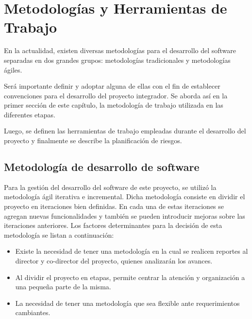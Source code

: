 
\chapter{Metodologías y Herramientas de Trabajo} %

\label{Chapter5} %
En la actualidad, existen diversas metodologías para el desarrollo del software separadas en dos grandes grupos: metodologías tradicionales y metodologías ágiles. 

Será importante definir y adoptar alguna de ellas con el fin de establecer convenciones para el desarrollo del proyecto integrador. Se aborda así en la primer sección de este capítulo, la metodología de trabajo utilizada en las diferentes etapas.

Luego, se definen las herramientas de trabajo empleadas durante el desarrollo del proyecto y finalmente se describe la planificación de riesgos.


\section{Metodología de desarrollo de software}
Para la gestión del desarrollo del software de este proyecto, se utilizó la metodología ágil iterativa e incremental. Dicha metodología consiste en dividir el proyecto en iteraciones bien definidas. En cada una de estas iteraciones se agregan nuevas funcionalidades y también se pueden introducir mejoras sobre las iteraciones anteriores. Los factores determinantes para la decisión de esta metodología se listan a continuación:

\begin{itemize}
	\item Existe la necesidad de tener una metodología en la cual se realicen reportes al director y co-director del proyecto, quienes analizarán los avances.
	\item Al dividir el proyecto en etapas, permite centrar la atención y organización a una pequeña parte de la misma.
	\item La necesidad de tener una metodología que sea flexible ante requerimientos cambiantes.
\end{itemize}

